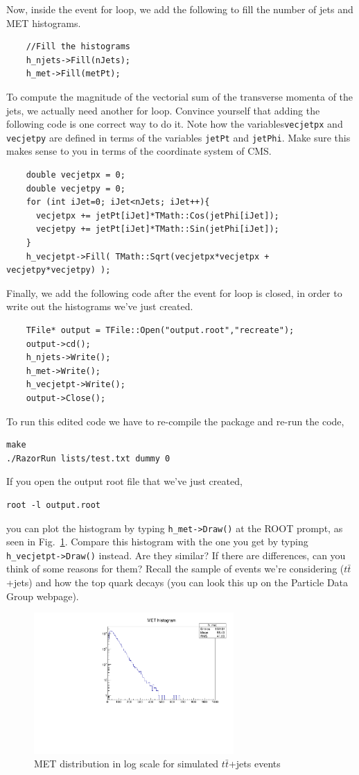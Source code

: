 \documentclass{article}
\begin{document}
Now, inside the event for loop, we add the following to fill the
number of jets and MET histograms.
\begin{verbatim}
	//Fill the histograms 
	h_njets->Fill(nJets);
	h_met->Fill(metPt);
\end{verbatim}

To compute the magnitude of the vectorial sum of the transverse momenta of the jets, we
actually need another for loop. Convince yourself that adding the
following code is one correct way to do it. Note how the variables\texttt{vecjetpx}
and \texttt{vecjetpy} are defined in terms of the variables
\texttt{jetPt} and \texttt{jetPhi}. Make sure this makes sense to you
in terms of the coordinate system of CMS.
\begin{verbatim}
	double vecjetpx = 0;
	double vecjetpy = 0;
	for (int iJet=0; iJet<nJets; iJet++){
	  vecjetpx += jetPt[iJet]*TMath::Cos(jetPhi[iJet]);
	  vecjetpy += jetPt[iJet]*TMath::Sin(jetPhi[iJet]);
	}	
	h_vecjetpt->Fill( TMath::Sqrt(vecjetpx*vecjetpx + vecjetpy*vecjetpy) );
\end{verbatim}


Finally, we add the following code after the event for loop is closed, in order to
write out the histograms we've just created.
\begin{verbatim}
    TFile* output = TFile::Open("output.root","recreate");
    output->cd();
    h_njets->Write();
    h_met->Write();
    h_vecjetpt->Write();
    output->Close();
\end{verbatim}

To run this edited code we have to re-compile the package and re-run
the code,
\begin{verbatim}
make
./RazorRun lists/test.txt dummy 0
\end{verbatim}

If you open the output root file that we've just created, 
\begin{verbatim}
root -l output.root
\end{verbatim}
you can plot the histogram by typing \texttt{h\_met->Draw()} at the
\textsc{ROOT} prompt, as seen in Fig.~\ref{fig:met}. Compare this histogram with the one you get by
typing \texttt{h\_vecjetpt->Draw()} instead. Are they similar? If there
are differences, can you think of some reasons for them? Recall the
sample of events we're considering ($t\bar{t}$+jets) and how the top
quark decays (you can look this up on the Particle Data Group webpage).

\begin{figure}
    \centering
    \includegraphics[width=3.0in]{met.pdf}
    \caption{MET distribution in log scale for simulated $t\bar{t}$+jets events}
    \label{fig:met}
\end{figure} 
\end{document}
